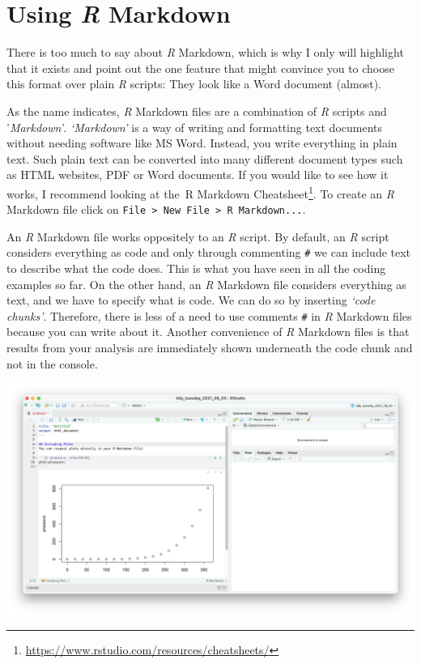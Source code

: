 \documentclass[
  letterpaper,
]{krantz}
\renewcommand{\href}[2]{#2\footnote{\url{#1}}}
\begin{document}
\section{\texorpdfstring{Using \emph{R}
Markdown}{Using R Markdown}}\label{r-markdown-and-r-notebooks}

There is too much to say about \emph{R} Markdown, which is why I only
will highlight that it exists and point out the one feature that might
convince you to choose this format over plain \emph{R} scripts: They
look like a Word document (almost).

As the name indicates, \emph{R} Markdown files are a combination of
\emph{R} scripts and '\emph{Markdown'}. \emph{`Markdown'} is a way of
writing and formatting text documents without needing software like MS
Word. Instead, you write everything in plain text. Such plain text can
be converted into many different document types such as HTML websites,
PDF or Word documents. If you would like to see how it works, I
recommend looking at
the~\href{https://www.rstudio.com/resources/cheatsheets/}{R Markdown
Cheatsheet}. To create an \emph{R} Markdown file click on
\texttt{File\ \textgreater{}\ New\ File\ \textgreater{}\ R\ Markdown...}.

An \emph{R} Markdown file works oppositely to an \emph{R} script. By
default, an \emph{R} script considers everything as code and only
through commenting \texttt{\#} we can include text to describe what the
code does. This is what you have seen in all the coding examples so far.
On the other hand, an \emph{R} Markdown file considers everything as
text, and we have to specify what is code. We can do so by inserting
\emph{`code chunks'}. Therefore, there is less of a need to use comments
\texttt{\#} in \emph{R} Markdown files because you can write about it.
Another convenience of \emph{R} Markdown files is that results from your
analysis are immediately shown underneath the code chunk and not in the
console.

\includegraphics{images/chapter_06_img/03_r_markdown/01_r_markdown_plain.png}
\end{document}
